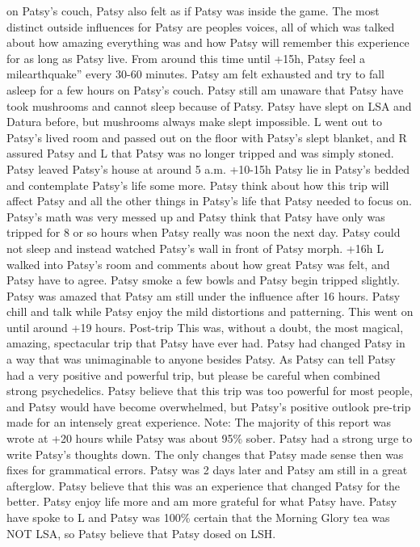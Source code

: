 \documentclass[12pt]{book}
\begin{document}
on Patsy's couch, Patsy also felt as if Patsy was inside the game. The most distinct outside influences for Patsy are peoples voices, all of which was talked about how amazing everything was and how Patsy will remember this experience for as long as Patsy live. From around this time until +15h, Patsy feel a milearthquake'' every 30-60 minutes. Patsy am felt exhausted and try to fall asleep for a few hours on Patsy's couch. Patsy still am unaware that Patsy have took mushrooms and cannot sleep because of Patsy. Patsy have slept on LSA and Datura before, but mushrooms always make slept impossible. L went out to Patsy's lived room and passed out on the floor with Patsy's slept blanket, and R assured Patsy and L that Patsy was no longer tripped and was simply stoned. Patsy leaved Patsy's house at around 5 a.m. +10-15h Patsy lie in Patsy's bedded and contemplate Patsy's life some more. Patsy think about how this trip will affect Patsy and all the other things in Patsy's life that Patsy needed to focus on. Patsy's math was very messed up and Patsy think that Patsy have only was tripped for 8 or so hours when Patsy really was noon the next day. Patsy could not sleep and instead watched Patsy's wall in front of Patsy morph. +16h L walked into Patsy's room and comments about how great Patsy was felt, and Patsy have to agree. Patsy smoke a few bowls and Patsy begin tripped slightly. Patsy was amazed that Patsy am still under the influence after 16 hours. Patsy chill and talk while Patsy enjoy the mild distortions and patterning. This went on until around +19 hours. Post-trip This was, without a doubt, the most magical, amazing, spectacular trip that Patsy have ever had. Patsy had changed Patsy in a way that was unimaginable to anyone besides Patsy. As Patsy can tell Patsy had a very positive and powerful trip, but please be careful when combined strong psychedelics. Patsy believe that this trip was too powerful for most people, and Patsy would have become overwhelmed, but Patsy's positive outlook pre-trip made for an intensely great experience. Note: The majority of this report was wrote at +20 hours while Patsy was about 95\% sober. Patsy had a strong urge to write Patsy's thoughts down. The only changes that Patsy made sense then was fixes for grammatical errors. Patsy was 2 days later and Patsy am still in a great afterglow. Patsy believe that this was an experience that changed Patsy for the better. Patsy enjoy life more and am more grateful for what Patsy have. Patsy have spoke to L and Patsy was 100\% certain that the Morning Glory tea was NOT LSA, so Patsy believe that Patsy dosed on LSH.
\end{document}
